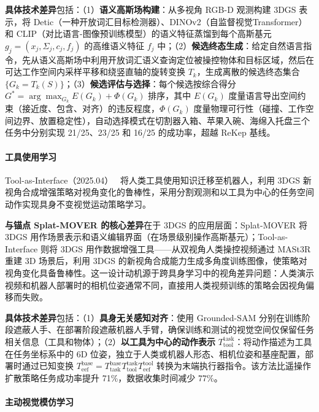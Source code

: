 \textbf{具体技术差异}包括：（1）\textbf{语义高斯场构建}：从多视角 RGB-D 观测构建 3DGS 表示，将 Detic（一种开放词汇目标检测器）、DINOv2（自监督视觉Transformer）和 CLIP（对比语言-图像预训练模型）的语义特征蒸馏到每个高斯基元 $g_j = (x_j, \Sigma_j, c_j, f_j)$ 的高维语义特征 $f_j$ 中；（2）\textbf{候选终态生成}：给定自然语言指令，先从语义高斯场中利用开放词汇语义查询定位被操控物体和目标区域，然后在可达工作空间内采样平移和绕竖直轴的旋转变换 $T_k$，生成离散的候选终态集合 $\{G_k = T_k(S)\}$；（3）\textbf{候选评估与选择}：每个候选按综合得分 $G^* = \arg\max_{G_k} E(G_k) + \Phi(G_k)$ 排序，其中 $E(G_k)$ 度量语言导出空间约束（接近度、包含、对齐）的违反程度，$\Phi(G_k)$ 度量物理可行性（碰撞、工作空间边界、放置稳定性），自动选择模式在切割器入箱、苹果入碗、海绵入托盘三个任务中分别实现 21/25、23/25 和 16/25 的成功率，超越 ReKep 基线。

\paragraph{工具使用学习}

Tool-as-Interface（2025.04）~\cite{2504_04612} 将人类工具使用知识迁移至机器人，利用 3DGS 新视角合成增强策略对视角变化的鲁棒性，采用分割观测和以工具为中心的任务空间动作实现具身不变视觉运动策略学习。

\textbf{与锚点 Splat-MOVER 的核心差异}在于 3DGS 的应用层面：Splat-MOVER 将 3DGS 用作场景表示和语义编辑界面（在场景级别操作高斯基元）；Tool-as-Interface 则将 3DGS 用作数据增强工具——从双视角人类操控视频通过 MASt3R 重建 3D 场景后，利用 3DGS 的新视角合成能力生成多角度训练图像，使策略对视角变化具备鲁棒性。这一设计动机源于跨具身学习中的视角差异问题：人类演示视频和机器人部署时的相机位姿通常不同，直接用人类视频训练的策略会因视角偏移而失败。

\textbf{具体技术差异}包括：（1）\textbf{具身无关感知对齐}：使用 Grounded-SAM 分别在训练阶段遮蔽人手、在部署阶段遮蔽机器人手臂，确保训练和测试的视觉空间仅保留任务相关信息（工具和物体）；（2）\textbf{以工具为中心的动作表示} $T_\text{tool}^\text{task}$：将动作描述为工具在任务坐标系中的 6D 位姿，独立于人类或机器人形态、相机位姿和基座配置，部署时通过已知变换 $T_\text{eef}^\text{base} = T_\text{task}^\text{base} T_\text{tool}^\text{task} T_\text{eef}^\text{tool}$ 转换为末端执行器指令。该方法比遥操作扩散策略任务成功率提升 71\%，数据收集时间减少 77\%。

\paragraph{主动视觉模仿学习}

